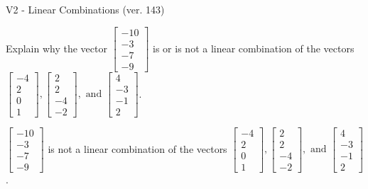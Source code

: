 \begin{exercise}
  \begin{exerciseTitle}V2 - Linear Combinations (ver. 143)\end{exerciseTitle}
  \begin{exerciseStatement}
    Explain why the vector \(\left[\begin{array}{c}
-10 \\
-3 \\
-7 \\
-9
\end{array}\right]\)  is or is not a linear 
	combination of the vectors \(\left[\begin{array}{c}
-4 \\
2 \\
0 \\
1
\end{array}\right] , \left[\begin{array}{c}
2 \\
2 \\
-4 \\
-2
\end{array}\right] , \text{ and } \left[\begin{array}{c}
4 \\
-3 \\
-1 \\
2
\end{array}\right]\).
	


  \end{exerciseStatement}
  \begin{exerciseAnswer}
   \(\left[\begin{array}{c}
-10 \\
-3 \\
-7 \\
-9
\end{array}\right]\) 
  	 is not  
	a linear combination of the vectors \(\left[\begin{array}{c}
-4 \\
2 \\
0 \\
1
\end{array}\right] , \left[\begin{array}{c}
2 \\
2 \\
-4 \\
-2
\end{array}\right] , \text{ and } \left[\begin{array}{c}
4 \\
-3 \\
-1 \\
2
\end{array}\right]\).

	
  


  \end{exerciseAnswer}
\end{exercise}